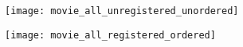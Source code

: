 \documentclass[12pt]{minimal}
\begin{document}
\noindent
{}
\texttt{[image: movie\_all\_unregistered\_unordered]}
\vspace{0.2cm}

\noindent
{}
\texttt{[image: movie\_all\_registered\_ordered]}
\end{document}
